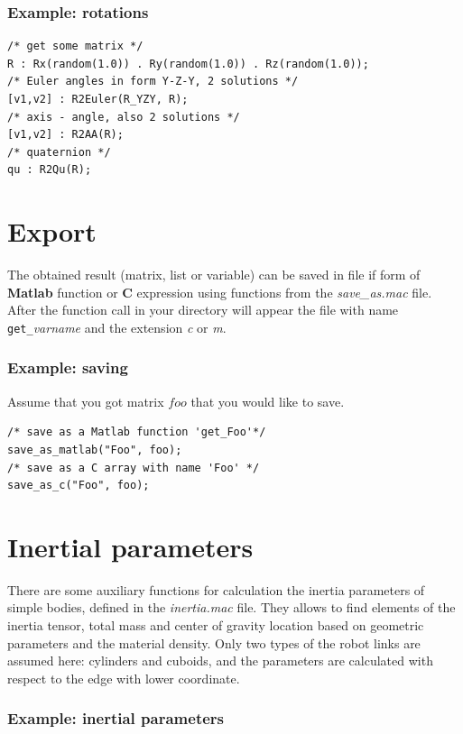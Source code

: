 \documentclass{article}
\begin{document}
\subsubsection{Example: rotations} 

\begin{verbatim}
/* get some matrix */
R : Rx(random(1.0)) . Ry(random(1.0)) . Rz(random(1.0));
/* Euler angles in form Y-Z-Y, 2 solutions */
[v1,v2] : R2Euler(R_YZY, R);
/* axis - angle, also 2 solutions */
[v1,v2] : R2AA(R);
/* quaternion */
qu : R2Qu(R);
\end{verbatim}

\section{Export}

The obtained result (matrix, list or variable) can be saved in file if form of \textbf{Matlab} function or \textbf{C} expression using functions from the \textit{save\_as.mac} file. After the function call in your directory will appear the file with name \texttt{get\_}\textit{varname} and the extension \textit{c} or \textit{m}. 

\subsubsection{Example: saving}

Assume that you got matrix $foo$ that you would like to save.
\begin{verbatim}
/* save as a Matlab function 'get_Foo'*/
save_as_matlab("Foo", foo);
/* save as a C array with name 'Foo' */
save_as_c("Foo", foo);
\end{verbatim}

\section{Inertial parameters}

There are some auxiliary functions for calculation the inertia parameters of simple bodies, defined in the \textit{inertia.mac} file. They allows to find elements of the inertia tensor, total mass and center of gravity location based on geometric parameters and the material density. Only two types of the robot links are assumed here: cylinders and cuboids, and the parameters are calculated with respect to the edge with lower coordinate. 

\subsubsection{Example: inertial parameters}
\end{document}
